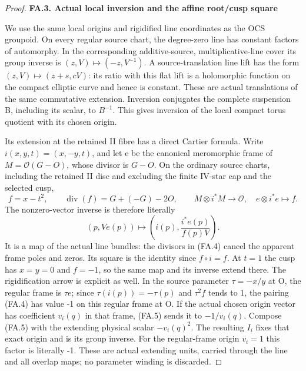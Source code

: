 \begin{proof}
\par

\medskip\noindent\textbf{FA.3. Actual local inversion and the affine root/cusp square}

\par\nobreak

We use the same local origins and rigidified line coordinates as the
OCS groupoid. On every regular source chart, the degree-zero line has
constant factors of automorphy. In the corresponding additive-source,
multiplicative-line cover its group inverse is \((z,V)\mapsto(-z,V^{-1})\).
A source-translation line lift has the form \((z,V)\mapsto(z+s,cV)\): its ratio
with this flat lift is a holomorphic function on the compact elliptic
curve and hence is constant. These are actual translations of the same
commutative extension. Inversion conjugates the complete suspension B,
including its scalar, to \(B^{-1}\). This gives inversion of the local compact
torus quotient with its chosen origin.

Its extension at the retained II fibre has a direct Cartier formula.
Write \(i(x,y,t)=(x,-y,t)\), and let e be the canonical meromorphic frame of
\(M=\mathcal O(G-O)\), whose divisor is \(G-O\). On the ordinary source charts,
including the retained II disc and excluding the finite IV-star cap
and the selected cusp,
\[
 f=x-t^2,\qquad \operatorname{div}(f)=G+(-G)-2O,
 \qquad M\otimes i^*M\longrightarrow\mathcal O,
                 \quad e\otimes i^*e\longmapsto f.       \tag{FA.4}
\]
The nonzero-vector inverse is therefore literally
\[
                (p,V e(p))\longmapsto
                    \left(i(p),\frac{i^*e(p)}{f(p)V}\right).
                                                               \tag{FA.5}
\]
It is a map of the actual line bundles: the divisors in (FA.4) cancel the
apparent frame poles and zeros. Its square is the identity since \(f\circ i=f\).
At \(t=1\) the cusp has \(x=y=0\) and \(f=-1\), so the same map and its inverse extend
there. The rigidification arrow is explicit as well. In the source
parameter \(\tau=-x/y\) at O, the regular frame is \(\tau e\); since
\(\tau(i(p))=-\tau(p)\) and \(\tau^2 f\) tends to 1, the pairing (FA.4)
has value -1 on this regular frame at O. If the actual chosen origin
vector has coefficient \(v_i(q)\) in that frame, (FA.5) sends it to
\(-1/v_i(q)\). Compose (FA.5) with the extending physical scalar
\(-v_i(q)^2\). The resulting \(I_i\) fixes that exact origin and is its
group inverse. For the regular-frame origin \(v_i=1\) this factor is
literally -1. These are actual extending units, carried through the
line and all overlap maps; no parameter winding is discarded.


\end{proof}
